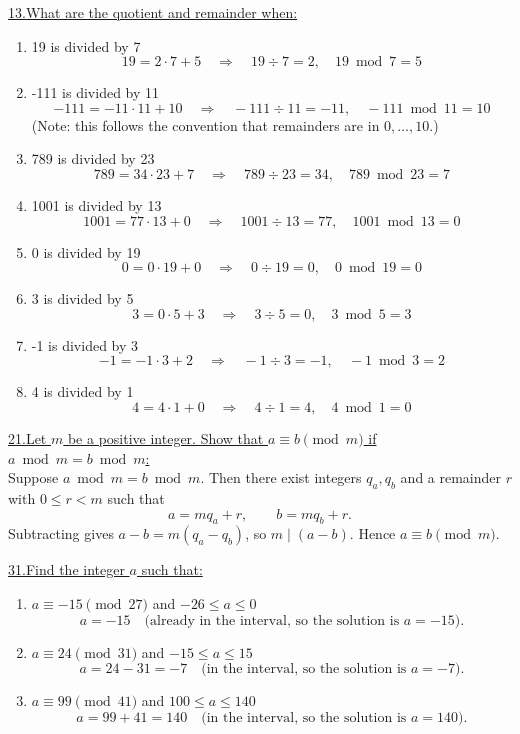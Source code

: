 \documentclass[12pt]{article}
\begin{document}
\vspace{5mm}
\underline{13.\;What are the quotient and remainder when:}
\begin{enumerate}[label=(\alph*)]
    \item 19 is divided by 7
    \[
    19 = 2 \cdot 7 + 5 \quad \Rightarrow \quad 19 \div 7 = 2, \quad 19 \bmod 7 = 5
    \]
    \item -111 is divided by 11
    \[
    -111 = -11 \cdot 11 + 10 \quad \Rightarrow \quad -111 \div 11 = -11, \quad -111 \bmod 11 = 10
    \]
    (Note: this follows the convention that remainders are in $0,\dots,10$.)
    \item 789 is divided by 23
    \[
    789 = 34 \cdot 23 + 7 \quad \Rightarrow \quad 789 \div 23 = 34, \quad 789 \bmod 23 = 7
    \]
    \item 1001 is divided by 13
    \[
    1001 = 77 \cdot 13 + 0 \quad \Rightarrow \quad 1001 \div 13 = 77, \quad 1001 \bmod 13 = 0
    \]
    \item 0 is divided by 19
    \[
    0 = 0 \cdot 19 + 0 \quad \Rightarrow \quad 0 \div 19 = 0, \quad 0 \bmod 19 = 0
    \]
    \item 3 is divided by 5
    \[
    3 = 0 \cdot 5 + 3 \quad \Rightarrow \quad 3 \div 5 = 0, \quad 3 \bmod 5 = 3
    \]
    \item -1 is divided by 3
    \[
    -1 = -1 \cdot 3 + 2 \quad \Rightarrow \quad -1 \div 3 = -1, \quad -1 \bmod 3 = 2
    \]
    \item 4 is divided by 1
    \[
    4 = 4 \cdot 1 + 0 \quad \Rightarrow \quad 4 \div 1 = 4, \quad 4 \bmod 1 = 0
    \]
\end{enumerate}

\vspace{5mm}
\noindent\underline{21.\;Let $m$ be a positive integer. Show that $a \equiv b \pmod{m}$ if $a \bmod m = b \bmod m$:}
\\\indent Suppose $a \bmod m = b \bmod m$. Then there exist integers $q_a,q_b$ and a remainder $r$ with $0\le r<m$ such that
\[
a = m q_a + r,\qquad b = m q_b + r.
\]
Subtracting gives $a-b = m(q_a-q_b)$, so $m\mid (a-b)$. Hence $a\equiv b\pmod m$.

\vspace{5mm}

\noindent\underline{31.\;Find the integer $a$ such that:}
\begin{enumerate}[label=(\alph*)]
    \item $a \equiv -15 \pmod{27}$ and $-26 \leq a \leq 0$
\[
a = -15 \quad \text{(already in the interval, so the solution is $a=-15$).}
\]

\item $a \equiv 24 \pmod{31}$ and $-15 \leq a \leq 15$
\[
a = 24 - 31 = -7 \quad \text{(in the interval, so the solution is $a=-7$).}
\]

\item $a \equiv 99 \pmod{41}$ and $100 \leq a \leq 140$
\[
a = 99 + 41 = 140 \quad \text{(in the interval, so the solution is $a=140$).}
\]

\end{enumerate}
\end{document}
